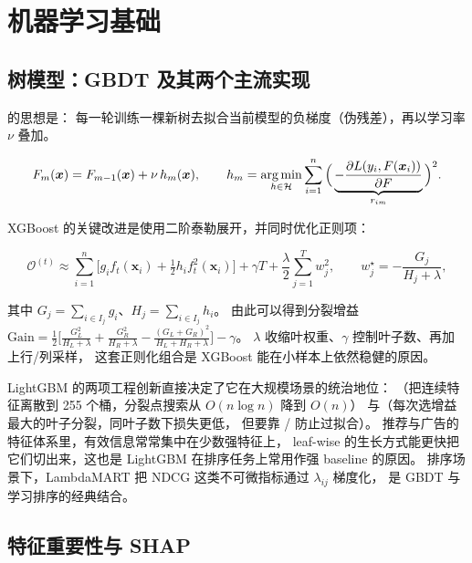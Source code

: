 \section{机器学习基础}

\subsection{树模型：GBDT 及其两个主流实现}

 的思想是：
每一轮训练一棵新树去拟合当前模型的负梯度（伪残差），再以学习率 $\nu$ 叠加。

\begin{equation}
F_m(\bm{x}) = F_{m-1}(\bm{x}) + \nu\, h_m(\bm{x}),
\qquad
h_m = \operatorname*{arg\,min}_{h \in \mathcal{H}} \sum_{i=1}^{n} \Big(\underbrace{-\frac{\partial L(y_i, F(\bm{x}_i))}{\partial F}}_{r_{im}}\Big)^2 .
\label{eq:gbdt}
\end{equation}

XGBoost 的关键改进是使用二阶泰勒展开，并同时优化正则项：

\begin{equation}
\mathcal{O}^{(t)} \approx \sum_{i=1}^{n}\Big[g_i f_t(\bm{x}_i) + \tfrac{1}{2}h_i f_t^2(\bm{x}_i)\Big]
+ \gamma T + \frac{\lambda}{2}\sum_{j=1}^{T} w_j^2,
\qquad
w_j^\star = -\frac{G_j}{H_j + \lambda},
\label{eq:xgboost}
\end{equation}

其中 $G_j = \sum_{i \in I_j} g_i$、$H_j = \sum_{i \in I_j} h_i$。
由此可以得到分裂增益 $\text{Gain} = \frac{1}{2}\big[\frac{G_L^2}{H_L+\lambda} + \frac{G_R^2}{H_R+\lambda}
- \frac{(G_L+G_R)^2}{H_L+H_R+\lambda}\big] - \gamma$。
$\lambda$ 收缩叶权重、$\gamma$ 控制叶子数、再加上行/列采样，
这套正则化组合是 XGBoost 能在小样本上依然稳健的原因。

LightGBM 的两项工程创新直接决定了它在大规模场景的统治地位：
（把连续特征离散到 255 个桶，分裂点搜索从 $O(n\log n)$ 降到 $O(n)$）
与（每次选增益最大的叶子分裂，同叶子数下损失更低，
但要靠  /  防止过拟合）。
推荐与广告的特征体系里，有效信息常常集中在少数强特征上，
leaf-wise 的生长方式能更快把它们切出来，这也是 LightGBM 在排序任务上常用作强 baseline 的原因。
排序场景下，LambdaMART \cite{wu2010lambdamart} 把 NDCG 这类不可微指标通过 $\lambda_{ij}$ 梯度化，
是 GBDT 与学习排序的经典结合。

\subsection{特征重要性与 SHAP}

